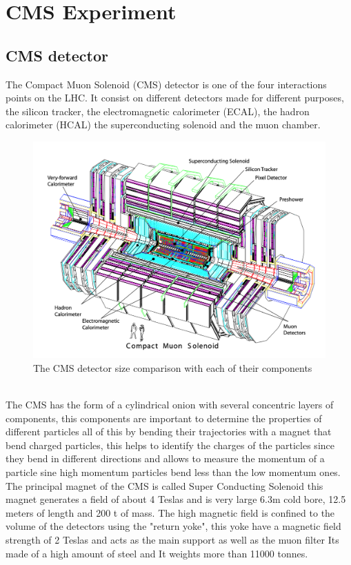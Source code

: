 \chapter{CMS Experiment}
\label{ch2}

\section{CMS detector}

The Compact Muon Solenoid (CMS) detector is one of the four interactions points on the LHC. It consist on different detectors made for different purposes, the silicon tracker, the electromagnetic calorimeter (ECAL), the hadron calorimeter (HCAL) the superconducting solenoid and the muon chamber. 
\\
\begin{figure}[h]
    \centering
     \includegraphics[width=1\textwidth]{cms2.png}
     \caption{The CMS detector size comparison with each of their components}
    \label{fig:four-forces}
\end{figure}

\\
The CMS has the form of a cylindrical onion with several concentric layers of components, this components are important to determine the properties of different particles all of this by bending their trajectories with a magnet that bend charged particles, this helps to identify the charges of the particles since they bend in different directions and allows to measure the momentum of a particle sine high momentum particles bend less than the low momentum ones. The principal magnet of the CMS is called Super Conducting Solenoid this magnet generates a field of about 4 Teslas and is very large 6.3m cold bore, 12.5 meters of length and 200 t of mass. The high magnetic field is confined to the volume of the detectors using the "return yoke", this yoke have a magnetic field strength of 2 Teslas and acts as the main support as well as the muon filter Its made of a high amount of steel and It weights more than 11000 tonnes.     \cite{CMS3}

